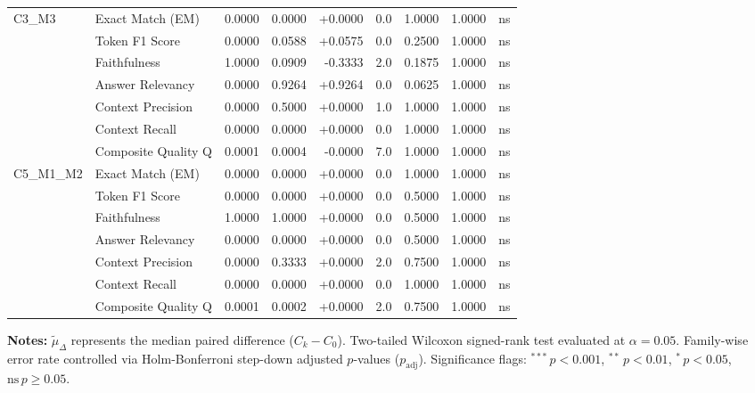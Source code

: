 \begin{table}[p]
\begin{tabular*}{\textwidth}{@{\extracolsep{\fill}} l l r r r r r r c @{}}
\addlinespace
C3\_M3          & Exact Match (EM)     & 0.0000 & 0.0000 & +0.0000 & 0.0 & 1.0000 & 1.0000 & ns \\
                & Token F1 Score       & 0.0000 & 0.0588 & +0.0575 & 0.0 & 0.2500 & 1.0000 & ns \\
                & Faithfulness         & 1.0000 & 0.0909 & -0.3333 & 2.0 & 0.1875 & 1.0000 & ns \\
                & Answer Relevancy     & 0.0000 & 0.9264 & +0.9264 & 0.0 & 0.0625 & 1.0000 & ns \\
                & Context Precision    & 0.0000 & 0.5000 & +0.0000 & 1.0 & 1.0000 & 1.0000 & ns \\
                & Context Recall       & 0.0000 & 0.0000 & +0.0000 & 0.0 & 1.0000 & 1.0000 & ns \\
                & Composite Quality Q  & 0.0001 & 0.0004 & -0.0000 & 7.0 & 1.0000 & 1.0000 & ns \\
\addlinespace
C5\_M1\_M2      & Exact Match (EM)     & 0.0000 & 0.0000 & +0.0000 & 0.0 & 1.0000 & 1.0000 & ns \\
                & Token F1 Score       & 0.0000 & 0.0000 & +0.0000 & 0.0 & 0.5000 & 1.0000 & ns \\
                & Faithfulness         & 1.0000 & 1.0000 & +0.0000 & 0.0 & 0.5000 & 1.0000 & ns \\
                & Answer Relevancy     & 0.0000 & 0.0000 & +0.0000 & 0.0 & 0.5000 & 1.0000 & ns \\
                & Context Precision    & 0.0000 & 0.3333 & +0.0000 & 2.0 & 0.7500 & 1.0000 & ns \\
                & Context Recall       & 0.0000 & 0.0000 & +0.0000 & 0.0 & 1.0000 & 1.0000 & ns \\
                & Composite Quality Q  & 0.0001 & 0.0002 & +0.0000 & 2.0 & 0.7500 & 1.0000 & ns \\
\bottomrule
\end{tabular*}
\vspace{0.5em}
\parbox{\textwidth}{\footnotesize
\textbf{Notes:} $\tilde{\mu}_\Delta$ represents the median paired difference ($C_k - C_0$). Two-tailed Wilcoxon signed-rank test evaluated at $\alpha = 0.05$. Family-wise error rate controlled via Holm-Bonferroni step-down adjusted $p$-values ($p_{\text{adj}}$). Significance flags: $^{***}\,p < 0.001$, $^{**}\,p < 0.01$, $^{*}\,p < 0.05$, $\text{ns}\,p \ge 0.05$.}
\end{table}
